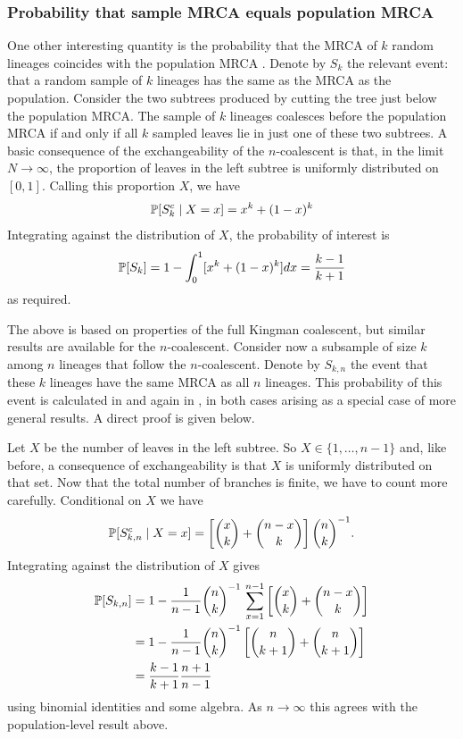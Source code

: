 \subsubsection{Probability that sample MRCA equals population MRCA}
One other interesting quantity is the probability that the MRCA of $k$ random lineages coincides with the population MRCA \parencite[e.g.][Theorem 1.7]{durrett2008}.
Denote by $S_k$ the relevant event: that a random sample of $k$ lineages has the same as the MRCA as the population.
Consider the two subtrees produced by cutting the tree just below the population MRCA. The sample of $k$ lineages coalesces before the population MRCA if and only if all $k$ sampled leaves lie in just one of these two subtrees.
A basic consequence of the exchangeability of the $n$-coalescent is that, in the limit $N\to\infty$, the proportion of leaves in the left subtree is uniformly distributed on $[0,1]$.
Calling this proportion $X$, we have
\begin{equation*}
\mathbb{P} [ S_k^c \mid X=x]
= x^k + (1-x)^k
\end{equation*}
Integrating against the distribution of $X$, the probability of interest is
\begin{equation*}
\mathbb{P}[ S_k ]
= 1- \int_0^1 [ x^k + (1-x)^k ] dx
= \frac{k-1}{k+1}
\end{equation*}
as required.

The above is based on properties of the full Kingman coalescent, but similar results are available for the $n$-coalescent.
Consider now a subsample of size $k$ among $n$ lineages that follow the $n$-coalescent.
Denote by $S_{k,n}$ the event that these $k$ lineages have the same MRCA as all $n$ lineages.
This probability of this event is calculated in \textcite[Example 1]{saunders1984} and again in \textcite[Equation (3)]{spouge2014}, in both cases arising as a special case of more general results. A direct proof is given below.

Let $X$ be the number of leaves in the left subtree. So $X \in \{1,\dots,n-1\} $ and, like before, a consequence of exchangeability is that $X$ is uniformly distributed on that set.
Now that the total number of branches is finite, we have to count more carefully. Conditional on $X$ we have
\begin{equation*}
\mathbb{P} [S_{k,n}^c \mid X=x]
= \left[ \binom{x}{k} + \binom{n-x}{k} \right] \binom{n}{k}^{-1} .
\end{equation*}
Integrating against the distribution of $X$ gives
\begin{align*}
\mathbb{P}[ S_{k,n} ]
&= 1 - \frac{1}{n-1} \binom{n}{k}^{-1} \, \sum_{x=1}^{n-1} 
        \left[ \binom{x}{k} + \binom{n-x}{k} \right] \\
&= 1 - \frac{1}{n-1} \binom{n}{k}^{-1} 
        \left[ \binom{n}{k+1} + \binom{n}{k+1} \right] \\
&= \frac{k-1}{k+1} \frac{n+1}{n-1}
\end{align*}
using binomial identities and some algebra.
As $n\to\infty$ this agrees with the population-level result above.



